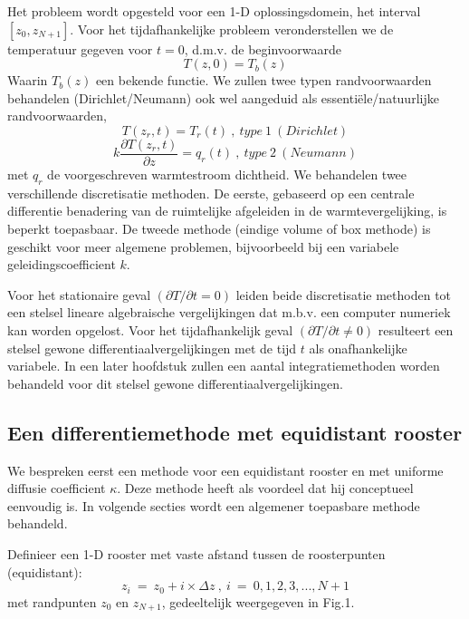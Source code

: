 Het probleem wordt opgesteld voor een 1-D oplossingsdomein, 
het interval
$[z_0 , z_{N+1} ]$.
Voor het tijdafhankelijke  probleem veronderstellen we de temperatuur gegeven
voor $t = 0$, d.m.v. de beginvoorwaarde
\begin{equation}
T(z ,0) = T_b (z)
\end{equation}
Waarin $T_b (z)$ een bekende functie.
We zullen twee typen randvoorwaarden behandelen (Dirichlet/Neumann)
ook wel aangeduid als essenti\"{e}le/natuurlijke randvoorwaarden,
\begin{equation}
T(z_r ,t) = T_r (t)  \ ,\  type \ 1\ (Dirichlet)
\end{equation}
\begin{equation}
k \frac{\partial T(z_r ,t )}{\partial z} = 
q_r (t) \  ,\  type \ 2\ (Neumann)
\end{equation}
met $q_r$ de voorgeschreven warmtestroom dichtheid.
We behandelen twee verschillende discretisatie methoden.
De eerste, gebaseerd op een centrale differentie benadering
van de ruimtelijke afgeleiden in de warmtevergelijking, is beperkt
toepasbaar.
De tweede methode (eindige volume of box methode) is geschikt voor
meer algemene problemen, bijvoorbeeld bij een variabele 
geleidingscoefficient $k$.

Voor het stationaire geval $( \partial T / \partial t = 0)$
leiden beide discretisatie methoden tot een stelsel lineare 
algebraische vergelijkingen
dat m.b.v. een computer numeriek kan worden opgelost.
Voor het tijdafhankelijk geval $( \partial T / \partial t \neq  0)$
resulteert een stelsel gewone differentiaalvergelijkingen
met de tijd $t$ als onafhankelijke variabele.
In een later hoofdstuk zullen een aantal
integratiemethoden worden behandeld voor dit stelsel 
gewone differentiaalvergelijkingen.
\subsection{Een differentiemethode met equidistant rooster}
We bespreken eerst een methode voor een equidistant rooster en met
uniforme diffusie coefficient $\kappa$.
Deze methode heeft als voordeel dat hij conceptueel eenvoudig is.
In volgende secties wordt een algemener toepasbare methode behandeld.

Definieer een 1-D rooster met vaste afstand tussen de roosterpunten
(equidistant):
\begin{equation}
z_i \ =\  z_0 + i \times \Delta z \ ,\  i\ =\ 0,1,2,3, ... , N+1
\end{equation}
met randpunten $z_0$ en $z_{N+1}$, gedeeltelijk weergegeven in
Fig.1.

